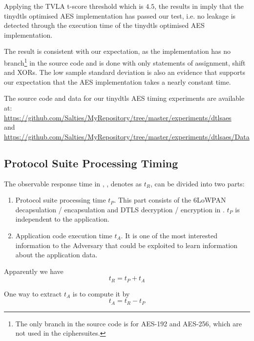 Applying the TVLA t-score threshold which is $4.5$, the results in  imply that the tinydtls optimised AES implementation has passed our test, i.e. no leakage is detected through the execution time of the tinydtls optimised AES implementation. 

The result is consistent with our expectation, as the implementation has no branch\footnote{The only branch in the source code is for AES-192 and AES-256, which are not used in the ciphersuites.} in the source code and is done with only statements of assignment, shift and XORs. The low sample standard deviation is also an evidence that supports our expectation that the AES implementation takes a nearly constant time.

The source code and data for our tinydtls AES timing experiments are available at: \\
\url{https://github.com/Salties/MyRepository/tree/master/experiments/dtlsaes} \\
and \\
\url{https://github.com/Salties/MyRepository/tree/master/experiments/dtlsaes/Data}

\subsection{Protocol Suite Processing Timing} \label{Protocol Suite Processing Time}

The observable response time in , , denotes as $t_R$, can be divided into two parts:

\begin{enumerate}
	\item Protocol suite processing time $t_P$. This part consists of the 6LoWPAN decapsulation / encapsulation and DTLS decryption / encryption in . $t_P$ is independent to the application. 
	\item Application code execution time $t_A$. It is one of the most interested information to the Adversary that could be exploited to learn information about the application data.
\end{enumerate}

Apparently we have
\begin{equation}
t_R = t_P + t_A
\end{equation}

One way to extract $t_A$ is to compute it by 
\begin{equation} \label{Eq: t_A}
t_A = t_R - t_P
\end{equation}

